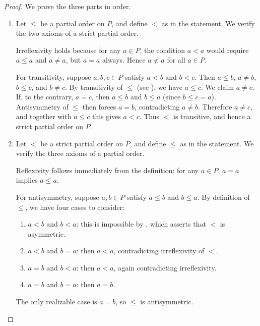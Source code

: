 \begin{proof}
    We prove the three parts in order.

    \begin{enumerate}
        \item Let $\leq$ be a partial order on $P$, and define $<$ as in the statement.
            We verify the two axioms of a strict partial order.

            Irreflexivity holds because for any $a \in P$, the condition $a < a$ would require
            $a \leq a$ and $a \neq a$, but $a = a$ always. Hence $a \not< a$ for all $a \in P$.

            For transitivity, suppose $a, b, c \in P$ satisfy $a < b$ and $b < c$.
            Then $a \leq b$, $a \neq b$, $b \leq c$, and $b \neq c$.
            By transitivity of $\leq$ (see ), we have $a \leq c$.
            We claim $a \neq c$. If, to the contrary, $a = c$, then $a \leq b$ and $b \leq a$
            (since $b \leq c = a$). Antisymmetry of $\leq$ then forces $a = b$, contradicting
            $a \neq b$. Therefore $a \neq c$, and together with $a \leq c$ this gives $a < c$.
            Thus $<$ is transitive, and hence a strict partial order on $P$.

        \item Let $<$ be a strict partial order on $P$, and define $\leq$ as in the statement.
            We verify the three axioms of a partial order.

            Reflexivity follows immediately from the definition: for any $a \in P$,
            $a = a$ implies $a \leq a$.

            For antisymmetry, suppose $a, b \in P$ satisfy $a \leq b$ and $b \leq a$.
            By definition of $\leq$, we have four cases to consider:
            \begin{enumerate}
                \item $a < b$ and $b < a$: this is impossible by
                    , which asserts that $<$ is asymmetric.
                \item $a < b$ and $b = a$: then $a < a$, contradicting irreflexivity of $<$.
                \item $a = b$ and $b < a$: then $a < a$, again contradicting irreflexivity.
                \item $a = b$ and $b = a$: then $a = b$.
            \end{enumerate}
            The only realizable case is $a = b$, so $\leq$ is antisymmetric.


\end{enumerate}
\end{proof}
